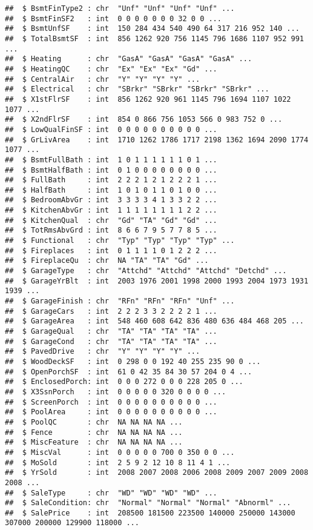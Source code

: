 \documentclass[]{article}
\begin{document}
\begin{verbatim}
##  $ BsmtFinType2 : chr  "Unf" "Unf" "Unf" "Unf" ...
##  $ BsmtFinSF2   : int  0 0 0 0 0 0 0 32 0 0 ...
##  $ BsmtUnfSF    : int  150 284 434 540 490 64 317 216 952 140 ...
##  $ TotalBsmtSF  : int  856 1262 920 756 1145 796 1686 1107 952 991 ...
##  $ Heating      : chr  "GasA" "GasA" "GasA" "GasA" ...
##  $ HeatingQC    : chr  "Ex" "Ex" "Ex" "Gd" ...
##  $ CentralAir   : chr  "Y" "Y" "Y" "Y" ...
##  $ Electrical   : chr  "SBrkr" "SBrkr" "SBrkr" "SBrkr" ...
##  $ X1stFlrSF    : int  856 1262 920 961 1145 796 1694 1107 1022 1077 ...
##  $ X2ndFlrSF    : int  854 0 866 756 1053 566 0 983 752 0 ...
##  $ LowQualFinSF : int  0 0 0 0 0 0 0 0 0 0 ...
##  $ GrLivArea    : int  1710 1262 1786 1717 2198 1362 1694 2090 1774 1077 ...
##  $ BsmtFullBath : int  1 0 1 1 1 1 1 1 0 1 ...
##  $ BsmtHalfBath : int  0 1 0 0 0 0 0 0 0 0 ...
##  $ FullBath     : int  2 2 2 1 2 1 2 2 2 1 ...
##  $ HalfBath     : int  1 0 1 0 1 1 0 1 0 0 ...
##  $ BedroomAbvGr : int  3 3 3 3 4 1 3 3 2 2 ...
##  $ KitchenAbvGr : int  1 1 1 1 1 1 1 1 2 2 ...
##  $ KitchenQual  : chr  "Gd" "TA" "Gd" "Gd" ...
##  $ TotRmsAbvGrd : int  8 6 6 7 9 5 7 7 8 5 ...
##  $ Functional   : chr  "Typ" "Typ" "Typ" "Typ" ...
##  $ Fireplaces   : int  0 1 1 1 1 0 1 2 2 2 ...
##  $ FireplaceQu  : chr  NA "TA" "TA" "Gd" ...
##  $ GarageType   : chr  "Attchd" "Attchd" "Attchd" "Detchd" ...
##  $ GarageYrBlt  : int  2003 1976 2001 1998 2000 1993 2004 1973 1931 1939 ...
##  $ GarageFinish : chr  "RFn" "RFn" "RFn" "Unf" ...
##  $ GarageCars   : int  2 2 2 3 3 2 2 2 2 1 ...
##  $ GarageArea   : int  548 460 608 642 836 480 636 484 468 205 ...
##  $ GarageQual   : chr  "TA" "TA" "TA" "TA" ...
##  $ GarageCond   : chr  "TA" "TA" "TA" "TA" ...
##  $ PavedDrive   : chr  "Y" "Y" "Y" "Y" ...
##  $ WoodDeckSF   : int  0 298 0 0 192 40 255 235 90 0 ...
##  $ OpenPorchSF  : int  61 0 42 35 84 30 57 204 0 4 ...
##  $ EnclosedPorch: int  0 0 0 272 0 0 0 228 205 0 ...
##  $ X3SsnPorch   : int  0 0 0 0 0 320 0 0 0 0 ...
##  $ ScreenPorch  : int  0 0 0 0 0 0 0 0 0 0 ...
##  $ PoolArea     : int  0 0 0 0 0 0 0 0 0 0 ...
##  $ PoolQC       : chr  NA NA NA NA ...
##  $ Fence        : chr  NA NA NA NA ...
##  $ MiscFeature  : chr  NA NA NA NA ...
##  $ MiscVal      : int  0 0 0 0 0 700 0 350 0 0 ...
##  $ MoSold       : int  2 5 9 2 12 10 8 11 4 1 ...
##  $ YrSold       : int  2008 2007 2008 2006 2008 2009 2007 2009 2008 2008 ...
##  $ SaleType     : chr  "WD" "WD" "WD" "WD" ...
##  $ SaleCondition: chr  "Normal" "Normal" "Normal" "Abnorml" ...
##  $ SalePrice    : int  208500 181500 223500 140000 250000 143000 307000 200000 129900 118000 ...
\end{verbatim}
\end{document}
